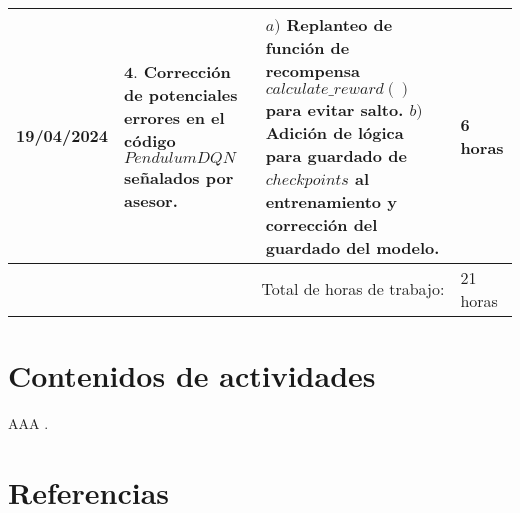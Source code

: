 \documentclass[12pt]{article}
\begin{document}
\hfill\\
\begin{minipage}[h]{\textwidth}
	\centering
	\begin{tabularx}{\textwidth}{|p{2cm}|X|X|p{2cm}|} 
		\hline		
		
	 	19/04/2024 & 
	 	$\mathbf{4}.$ Corrección de potenciales errores en el código $PendulumDQN$ señalados por asesor. &
	 	$a)$ Replanteo de función de recompensa $calculate\_ reward()$ para evitar salto. \newline
	 	$b)$ Adición de lógica para guardado de $checkpoints$ al entrenamiento y corrección del guardado del modelo. \newline & 
	 	6 horas \\
	 	
	 	\hline
		\multicolumn{3}{|r|}{Total de horas de trabajo:} & 21 horas \\ 
	 	\hline                 
	\end{tabularx}
\end{minipage}




\section*{Contenidos de actividades}

AAA \cite{DQNCart}.


\newpage

\section*{Referencias}
\renewcommand\refname{}


\end{document}

